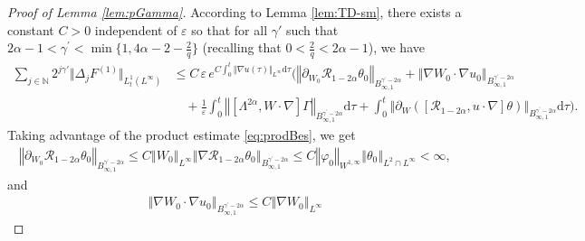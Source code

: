 \documentclass[reqno,11pt,a4paper]{amsart}
\newcommand{\dd}{\mathrm{d}}
\begin{document}
\begin{proof}[Proof of Lemma \ref{lem:pGamma}]
According to Lemma \ref{lem:TD-sm},
there exists a constant $C>0$ independent of $\varepsilon$ so that for all $\gamma'$ such that  $2\alpha-1<\gamma^{\prime}<
\min\{1,4\alpha-2-\frac{2}{q}\}$ (recalling that $0<\frac{2}{q}<2\alpha-1 $), we have %
\begin{align*}
  \sum_{j\in\mathbb{N}} 2^{j\gamma'} \Vert \Delta_j F^{(1)}\Vert _{L^1_t(L^\infty)}
  & \leq C\, \varepsilon\, e^{C\int_0^t\Vert \nabla u(\tau)\Vert _{L^\infty}\dd \tau}
  \bigg(\left\Vert \partial_{W_0} \mathcal{R}_{1-2\alpha}\theta_0\right\Vert _{B_{\infty, 1}^{\gamma^{\prime}-2\alpha}} 
  + \left\Vert \nabla W_0\cdot\nabla u_0\right\Vert _{B_{\infty, 1}^{\gamma^{\prime}-2\alpha}} \\
  & \quad +\frac{1}{\varepsilon} \int_0^t\left\Vert \left[\Lambda^{2\alpha}, W \cdot \nabla\right] 
  \Gamma\right\Vert _{ B_{\infty, 1}^{\gamma^{\prime}-2\alpha}}\dd \tau 
  +\int_0^t\left\Vert \partial_W\left(\left[\mathcal{R}_{1-2\alpha}, u \cdot \nabla\right] 
  \theta\right)\right\Vert _{B_{\infty, 1}^{\gamma^{\prime}-2\alpha}}
  \dd \tau \bigg).
\end{align*}
Taking advantage of the product estimate \eqref{eq:prodBes}, we get
\begin{align*}
  \left\Vert \partial_{W_0} \mathcal{R}_{1-2\alpha} \theta_0\right\Vert _{B_{\infty, 1}^{\gamma^{\prime}-2\alpha}} 
  \leq C \left\Vert W_0\right\Vert _{L^\infty} 
  \left\Vert \nabla \mathcal{R}_{1-2\alpha} \theta_0\right\Vert _{ B_{\infty, 1}^{\gamma^{\prime}-2\alpha}}
  \leq C \left\Vert \varphi_0\right\Vert _{W^{1, \infty}}\left\Vert \theta_0\right\Vert _{L^2\cap L^\infty} <\infty,
\end{align*}
and
\begin{align*}
   \left\Vert \nabla W_0\cdot\nabla u_0\right\Vert _{ B_{\infty, 1}^{\gamma^{\prime}-2\alpha}}  \leq C \left\Vert \nabla W_0\right\Vert _{L^{\infty}}

\end{align*}
\end{proof}
\end{document}
